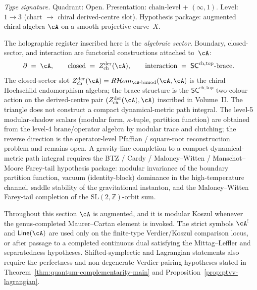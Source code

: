 \begin{definition}
\label{def:supp-algebraic-sector-register}
\textit{Type signature.}
Quadrant: Open. Presentation: chain-level + $(\infty,1)$.
Level: $1 \to 3$ (chart $\to$ chiral derived-centre slot).
Hypothesis package: augmented chiral algebra $\cA$ on a smooth
projective curve~$X$.
\medskip

The holographic register inscribed here is the \emph{algebraic
sector}. Boundary, closed-sector, and interaction are functorial
constructions attached to~$\cA$:
\begin{equation}\label{eq:supp-algebraic-sector}
\partial \;=\; \cA, \qquad
\mathrm{closed} \;=\; Z^{\mathrm{der}}_{\mathrm{ch}}(\cA), \qquad
\mathrm{interaction} \;=\; \mathsf{SC}^{\mathrm{ch,top}}\text{-brace}.
\end{equation}
The closed-sector slot $Z^{\mathrm{der}}_{\mathrm{ch}}(\cA)
= R\mathcal{H}om_{\cA\text{-bimod}}(\cA, \cA)$ is the chiral Hochschild
endomorphism algebra; the brace structure is the
$\mathsf{SC}^{\mathrm{ch,top}}$ two-colour action on the derived-centre
pair $(Z^{\mathrm{der}}_{\mathrm{ch}}(\cA), \cA)$ inscribed in
Volume~II. The triangle does not construct a compact dynamical-metric
path integral. The level-5 modular-shadow scalars
(modular form, $\kappa$-tuple, partition function) are obtained from
the level-4 brane/operator algebra by modular trace and clutching;
the reverse direction is the operator-level Pfaffian /
square-root reconstruction problem and remains open. A gravity-line
completion to a compact dynamical-metric path integral requires
the BTZ / Cardy / Maloney--Witten / Manschot--Moore Farey-tail
hypothesis package: modular invariance of the boundary partition
function, vacuum (identity-block) dominance in the high-temperature
channel, saddle stability of the gravitational instanton, and the
Maloney--Witten Farey-tail completion of the $\mathrm{SL}(2,
\mathbb{Z})$-orbit sum.
\end{definition}

Throughout this section $\cA$ is augmented, and it is modular Koszul
whenever the genus-completed Maurer--Cartan element is invoked. The
strict symbols $\cA^!$ and $\mathsf{Line}(\cA)$ are used only on the
finite-type Verdier/Koszul comparison locus, or after passage to a
completed continuous dual satisfying the Mittag--Leffler and
separatedness hypotheses. Shifted-symplectic and Lagrangian statements
also require the perfectness and non-degenerate Verdier-pairing
hypotheses stated in Theorem~\ref{thm:quantum-complementarity-main}
and Proposition~\ref{prop:ptvv-lagrangian}.

